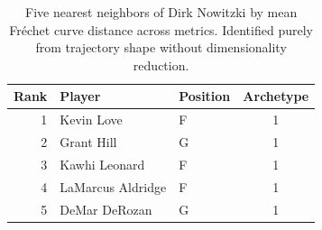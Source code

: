 \begin{table}[htbp]
  \centering\small
  \begin{tabular}{rllc}
    \toprule
    Rank & Player & Position & Archetype \\
    \midrule
    1 & Kevin Love & F & 1 \\
    2 & Grant Hill & G & 1 \\
    3 & Kawhi Leonard & F & 1 \\
    4 & LaMarcus Aldridge & F & 1 \\
    5 & DeMar DeRozan & G & 1 \\
    \bottomrule
  \end{tabular}
  \caption{Five nearest neighbors of Dirk Nowitzki by mean Fr\'{e}chet curve distance across metrics. Identified purely from trajectory shape without dimensionality reduction.}
  \label{tab:Dirk_Nowitzki_frechet_curve_neighbors}
\end{table}


